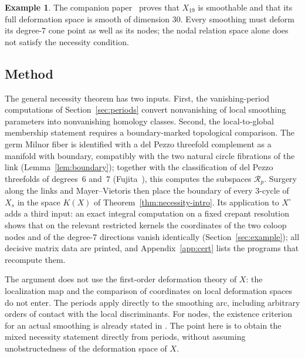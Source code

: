 \documentclass[11pt]{amsart}
\theoremstyle{definition}
\newtheorem{example}[theorem]{Example}
\theoremstyle{remark}
\theoremstyle{plain}
\newcommand{\Rsm}{\mathcal{R}}   %
\begin{document}
\begin{example}\label{q:X19}
The companion paper~\cite{PaperV} proves that $X_{19}$ is smoothable and
that its full deformation space is smooth of dimension $30$.  Every
smoothing must deform its degree-$7$ cone point as well as its nodes;
the nodal relation space alone does not satisfy the necessity condition.
\end{example}

\subsection{Method}
The general necessity theorem has two inputs.  First, the vanishing-period computations of
Section~\ref{sec:periods} convert nonvanishing of local smoothing parameters
into nonvanishing homology classes.  Second, the local-to-global membership
statement requires a boundary-marked topological comparison.  The germ Milnor
fiber is identified with a del Pezzo threefold complement as a manifold with
boundary, compatibly with the two natural circle fibrations of the link
(Lemma~\ref{lem:boundary}); together with the classification of del Pezzo
threefolds of degrees~$6$ and~$7$ (Fujita~\cite{Fujita80a}), this computes the
subspaces $\Rsm_p$.  Surgery along the links and Mayer--Vietoris then place the
boundary of every $3$-cycle of $X_s$ in the space $K(X)$ of
Theorem~\ref{thm:necessity-intro}.  Its application to $X^{\circ}$ adds a third
input: an exact
integral computation on a fixed crepant resolution shows that on the
relevant restricted kernels the coordinates of the two coloop nodes
and of the degree-$7$ directions vanish identically
(Section~\ref{sec:example}); all decisive matrix data are printed, and
Appendix~\ref{app:cert} lists the programs that recompute them.

The argument does not use the first-order deformation theory of $X$:
the localization map and the comparison of coordinates on local
deformation spaces do not enter.  The periods apply directly to the
smoothing arc, including arbitrary orders of contact with the local
discriminants.  For nodes, the existence criterion for an actual
smoothing is already stated in \cite[Thm.~1.3]{RT09}.  The point here is
to obtain the mixed necessity statement directly from periods, without
assuming unobstructedness of the deformation space of $X$.
\end{document}
